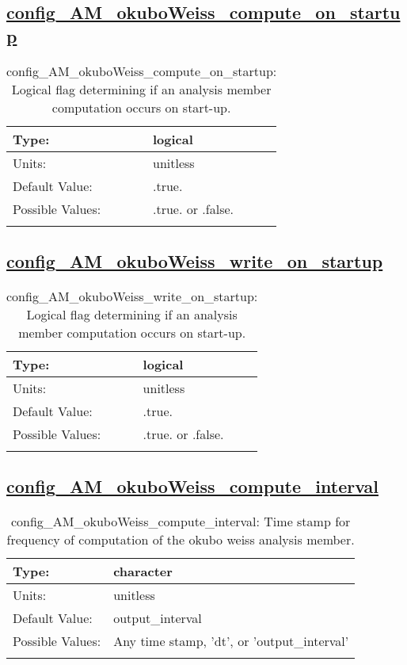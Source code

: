 \subsection[config\_AM\_okuboWeiss\_compute\_on\_startup]{\hyperref[sec:nm_tab_AM_okuboWeiss]{config\_AM\_okuboWeiss\_compute\_on\_startup}}
\label{subsec:nm_sec_config_AM_okuboWeiss_compute_on_startup}
\begin{center}
\begin{longtable}{| p{2.0in} || p{4.0in} |}
    \hline
    Type: & logical \\
    \hline
    Units: & \si{unitless} \\
    \hline
    Default Value: & .true. \\
    \hline
    Possible Values: & .true. or .false. \\
    \hline
    \caption{config\_AM\_okuboWeiss\_compute\_on\_startup: Logical flag determining if an analysis member computation occurs on start-up.}
\end{longtable}
\end{center}
\subsection[config\_AM\_okuboWeiss\_write\_on\_startup]{\hyperref[sec:nm_tab_AM_okuboWeiss]{config\_AM\_okuboWeiss\_write\_on\_startup}}
\label{subsec:nm_sec_config_AM_okuboWeiss_write_on_startup}
\begin{center}
\begin{longtable}{| p{2.0in} || p{4.0in} |}
    \hline
    Type: & logical \\
    \hline
    Units: & \si{unitless} \\
    \hline
    Default Value: & .true. \\
    \hline
    Possible Values: & .true. or .false. \\
    \hline
    \caption{config\_AM\_okuboWeiss\_write\_on\_startup: Logical flag determining if an analysis member computation occurs on start-up.}
\end{longtable}
\end{center}
\subsection[config\_AM\_okuboWeiss\_compute\_interval]{\hyperref[sec:nm_tab_AM_okuboWeiss]{config\_AM\_okuboWeiss\_compute\_interval}}
\label{subsec:nm_sec_config_AM_okuboWeiss_compute_interval}
\begin{center}
\begin{longtable}{| p{2.0in} || p{4.0in} |}
    \hline
    Type: & character \\
    \hline
    Units: & \si{unitless} \\
    \hline
    Default Value: & output\_interval \\
    \hline
    Possible Values: & Any time stamp, 'dt', or 'output\_interval' \\
    \hline
    \caption{config\_AM\_okuboWeiss\_compute\_interval: Time stamp for frequency of computation of the okubo weiss analysis member.}
\end{longtable}
\end{center}
